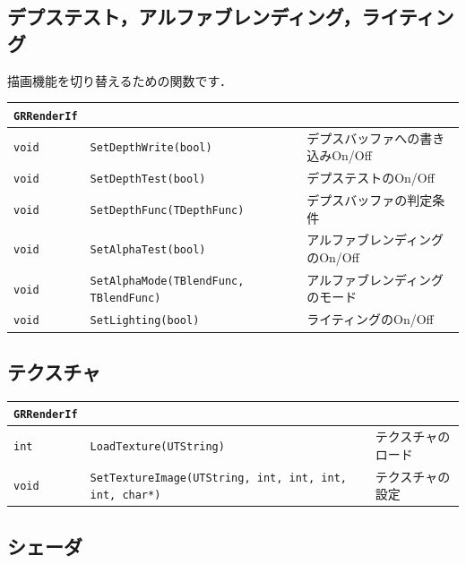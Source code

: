 \subsection*{デプステスト，アルファブレンディング，ライティング}

\KLUDGE 描画機能を切り替えるための関数です．

\begin{center}
\begin{tabular}{p{.1\hsize}p{.4\hsize}p{.4\hsize}}
\texttt{GRRenderIf}									&										\\ \midrule
\texttt{void} & \texttt{SetDepthWrite(bool)}					& デプスバッファへの書き込みOn/Off		\\
\texttt{void} & \texttt{SetDepthTest(bool)}						& デプステストのOn/Off					\\
\texttt{void} & \texttt{SetDepthFunc(TDepthFunc)}				& デプスバッファの判定条件				\\
\texttt{void} & \texttt{SetAlphaTest(bool)}						& アルファブレンディングのOn/Off		\\
\texttt{void} & \texttt{SetAlphaMode(TBlendFunc, TBlendFunc)}	& アルファブレンディングのモード		\\
\texttt{void} & \texttt{SetLighting(bool)}						& ライティングのOn/Off					\\
\end{tabular}
\end{center}

\subsection*{テクスチャ}

\begin{center}
\begin{tabular}{p{.15\hsize}p{.45\hsize}p{.3\hsize}}
\texttt{GRRenderIf}														&						\\ \midrule
\texttt{int} 	& \texttt{LoadTexture(UTString)}										& テクスチャのロード	\\
\texttt{void} 	& \texttt{SetTextureImage(UTString, int, int, int, int, char*)}		& テクスチャの設定		\\
\end{tabular}
\end{center}

\subsection*{シェーダ}

